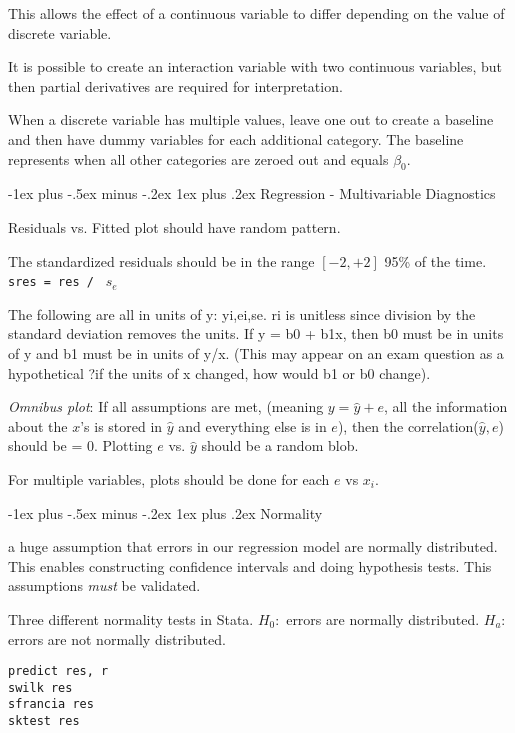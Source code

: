 \documentclass[10pt,landscape]{article}
\makeatletter
\renewcommand{\subsubsection}{\@startsection{subsubsection}{3}{0mm}%
                                {-1ex plus -.5ex minus -.2ex}%
                                {1ex plus .2ex}%
                                {\normalfont\small\bfseries}}
\makeatother
\begin{document}
\begin{multicols*}{3}
This allows the effect of a continuous variable to differ depending on the value of discrete variable.

It is possible to create an interaction variable with two continuous variables, but then partial derivatives are required for interpretation.

When a discrete variable has multiple values, leave one out to create a baseline and then have dummy variables for each additional category. The baseline represents when all other categories are zeroed out and equals $\beta_0$. 

\subsubsection{Regression - Multivariable Diagnostics}

Residuals vs. Fitted plot should have random pattern.

The standardized residuals should be in the range $[-2, +2]$ 95\% of the time.  \texttt{sres = res / } $s_e$

The following are all in units of y: yi,ei,se. ri is unitless since division by the standard deviation removes the units. If y = b0 + b1x, then b0 must be in units of y and b1 must be in units of y/x. (This may appear on an exam question as a hypothetical ?if the units of x changed, how would b1 or b0 change).

\textit{Omnibus plot}: If all assumptions are met, (meaning $y = \hat{y} + e$, all the information about the $x$'s is stored in $\hat{y}$ and everything else is in $e$), then the correlation($\hat{y},e$) should be = 0. Plotting $e$ vs. $\hat{y}$ should be a random blob.

For multiple variables, plots should be done for each $e$ vs $x_i$.


\subsubsection{Normality}

a huge assumption that errors in our regression model are normally distributed. This enables constructing confidence intervals and doing hypothesis tests. This assumptions \textit{must} be validated.

Three different normality tests in Stata. $H_0:$ errors are normally distributed. $H_a:$ errors are not normally distributed.
\begin{verbatim}
predict res, r
swilk res
sfrancia res
sktest res
\end{verbatim}


\end{multicols*}
\end{document}
